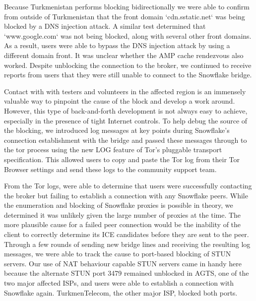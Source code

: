 \documentclass[letterpaper,twocolumn]{article}
\begin{document}
Because Turkmenistan performs blocking bidirectionally
we were able to confirm from outside of Turkmenistan 
that the front domain `cdn.sstatic.net` was being blocked by a DNS injection attack.
A similar test determined that `www.google.com` was not being blocked, along with several other front domains.
As a result, users were able to bypass the DNS injection attack 
by using a different domain front. It was unclear whether the AMP cache rendezvous also worked.
Despite unblocking the connection to the broker, we continued to receive reports from users that they were still unable to 
connect to the Snowflake bridge.

Contact with
with testers and volunteers in the affected region is an immensely valuable 
way to pinpoint the cause of the block and develop a work around. However, this type of back-and-forth 
development is not always easy to achieve, especially in the presence of tight Internet controls.
To help debug the source of the blocking, we introduced log messages at key points during Snowflake's
connection establishment with the bridge and passed these messages through to the tor process using
the new LOG feature of Tor's pluggable transport specification.
This allowed users to copy and paste the Tor log from their Tor Browser settings and send these logs
to the community support team.

From the Tor logs, were able to determine that users were successfully contacting the broker but failing to 
establish a connection with any Snowflake peers.
While the enumeration and blocking of Snowflake proxies is 
possible in theory, we determined it was unlikely given the large number of proxies at the time.
The more plausible cause for a failed peer connection would be the inability of the client to correctly determine 
its ICE candidates before they are sent to the peer. Through a few rounds of sending new bridge lines and receiving 
the resulting log messages, we were able to track the cause to port-based blocking of STUN servers.
Our use of NAT behaviour capable STUN servers came in handy here because the alternate STUN port 3479 remained
unblocked in AGTS, one of the two major affected ISPs, and users were able to establish a connection
with Snowflake again. TurkmenTelecom, the other major ISP, blocked both ports.
\end{document}
